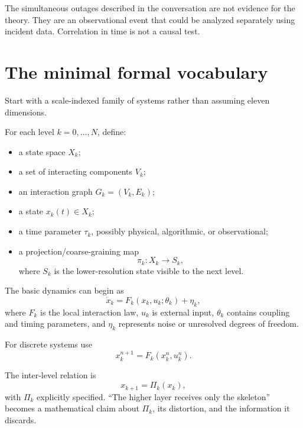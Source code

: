 \documentclass[11pt]{article}
\newcommand{\Coarse}{\Pi}
\newcommand{\Projection}{\pi}
\theoremstyle{definition}
\theoremstyle{plain}
\theoremstyle{remark}
\begin{document}
The simultaneous outages described in the conversation are not evidence for the theory. They are an observational event that could be analyzed separately using incident data. Correlation in time is not a causal test.

\section{The minimal formal vocabulary}

Start with a scale-indexed family of systems rather than assuming eleven dimensions.

For each level $k=0,\ldots,N$, define:
\begin{itemize}
  \item a state space $X_k$;
  \item a set of interacting components $V_k$;
  \item an interaction graph $G_k=(V_k,E_k)$;
  \item a state $x_k(t)\in X_k$;
  \item a time parameter $\tau_k$, possibly physical, algorithmic, or observational;
  \item a projection/coarse-graining map
  \begin{equation*}
    \Projection_k:X_k\longrightarrow S_k,
  \end{equation*}
  where $S_k$ is the lower-resolution state visible to the next level.
\end{itemize}

The basic dynamics can begin as
\begin{equation}
  \dot{x}_k=F_k(x_k,u_k;\theta_k)+\eta_k,
  \label{eq:continuous-dynamics}
\end{equation}
where $F_k$ is the local interaction law, $u_k$ is external input, $\theta_k$ contains coupling and timing parameters, and $\eta_k$ represents noise or unresolved degrees of freedom.

For discrete systems use
\begin{equation}
  x_k^{n+1}=F_k(x_k^n,u_k^n).
  \label{eq:discrete-dynamics}
\end{equation}

The inter-level relation is
\begin{equation}
  x_{k+1}=\Coarse_k(x_k),
  \label{eq:interlevel-map}
\end{equation}
with $\Coarse_k$ explicitly specified. ``The higher layer receives only the skeleton'' becomes a mathematical claim about $\Coarse_k$, its distortion, and the information it discards.
\end{document}
